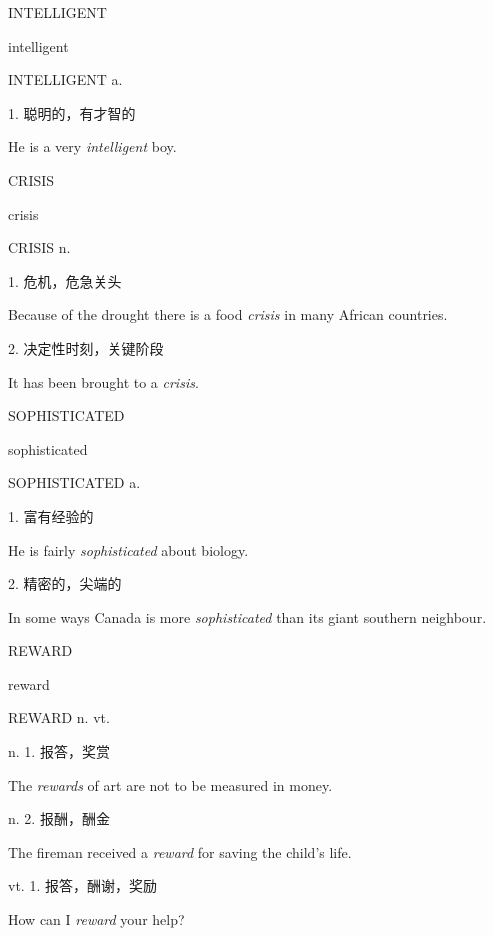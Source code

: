 \begin{flashcard}{
INTELLIGENT

intelligent
}
\begin{center}
INTELLIGENT a. 
\end{center}
1. 聪明的，有才智的

He is a very \textit{intelligent} boy.

\end{flashcard}
\begin{flashcard}{
CRISIS

crisis
}
\begin{center}
CRISIS n. 
\end{center}
1. 危机，危急关头

Because of the drought there is a food \textit{crisis} in many African countries.

2. 决定性时刻，关键阶段

It has been brought to a \textit{crisis}.

\end{flashcard}
\begin{flashcard}{
SOPHISTICATED

sophisticated
}
\begin{center}
SOPHISTICATED a. 
\end{center}
1. 富有经验的

He is fairly \textit{sophisticated} about biology.

2. 精密的，尖端的

In some ways Canada is more \textit{sophisticated} than its giant southern neighbour.

\end{flashcard}
\begin{flashcard}{
REWARD

reward
}
\begin{center}
REWARD n. vt. 
\end{center}
n. 1. 报答，奖赏

The \textit{rewards} of art are not to be measured in money.

n. 2. 报酬，酬金

The fireman received a \textit{reward} for saving the child's life.

vt. 1. 报答，酬谢，奖励

How can I \textit{reward} your help?

\end{flashcard}
